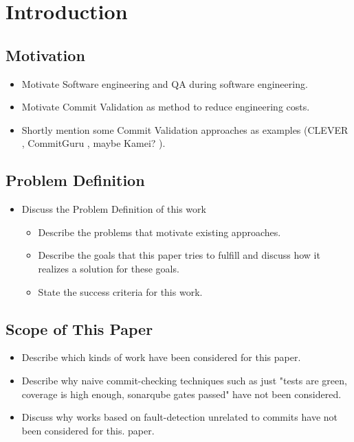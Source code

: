 \section{Introduction}

\subsection{Motivation}
\begin{itemize}
	\item Motivate Software engineering and QA during software engineering.
	\item Motivate Commit Validation as method to reduce engineering costs.
	\item Shortly mention some Commit Validation approaches as examples (CLEVER \cite{Nayrolles2018}, CommitGuru \cite{Rosen2015}, maybe Kamei? \cite{Kamei2013}).
\end{itemize}

\subsection{Problem Definition}
\begin{itemize}
	\item Discuss the Problem Definition of this work
	\begin{itemize}
		\item Describe the problems that motivate existing approaches.
		\item Describe the goals that this paper tries to fulfill and discuss how it realizes a solution for these goals.
		\item State the success criteria for this work.
	\end{itemize}
\end{itemize}

\subsection{Scope of This Paper}
\label{sec:scope}
\begin{itemize}
	\item Describe which kinds of work have been considered for this paper.
	\item Describe why naive commit-checking techniques such as just "tests are green, coverage is high enough, sonarqube gates passed" have not been considered.
	\item Discuss why works based on fault-detection unrelated to commits have not been considered for this. paper.
\end{itemize}

